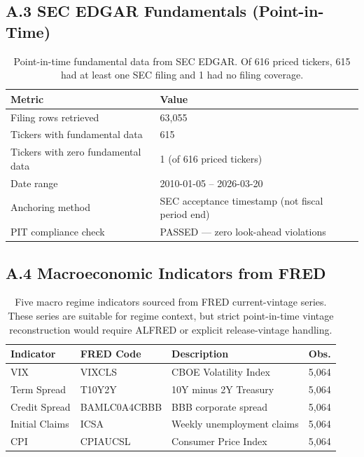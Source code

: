 \documentclass[11pt, a4paper]{article}
\begin{document}
\subsection*{A.3 SEC EDGAR Fundamentals (Point-in-Time)}
\begin{table}[h]
\centering
\begin{tabular}{ll}
\toprule
\textbf{Metric} & \textbf{Value} \\
\midrule
Filing rows retrieved & 63,055 \\
Tickers with fundamental data & 615 \\
Tickers with zero fundamental data & 1 (of 616 priced tickers) \\
Date range & 2010-01-05 -- 2026-03-20 \\
Anchoring method & SEC acceptance timestamp (not fiscal period end) \\
PIT compliance check & PASSED --- zero look-ahead violations \\
\bottomrule
\end{tabular}
\caption{Point-in-time fundamental data from SEC EDGAR. Of 616 priced tickers, 615 had at least one SEC filing and 1 had no filing coverage.}
\end{table}

\subsection*{A.4 Macroeconomic Indicators from FRED}
\begin{table}[h]
\centering
\begin{tabular}{llll}
\toprule
\textbf{Indicator} & \textbf{FRED Code} & \textbf{Description} & \textbf{Obs.} \\
\midrule
VIX & VIXCLS & CBOE Volatility Index & 5,064 \\
Term Spread & T10Y2Y & 10Y minus 2Y Treasury & 5,064 \\
Credit Spread & BAMLC0A4CBBB & BBB corporate spread & 5,064 \\
Initial Claims & ICSA & Weekly unemployment claims & 5,064 \\
CPI & CPIAUCSL & Consumer Price Index & 5,064 \\
\bottomrule
\end{tabular}
\caption{Five macro regime indicators sourced from FRED current-vintage series. These series are suitable for regime context, but strict point-in-time vintage reconstruction would require ALFRED or explicit release-vintage handling.}
\end{table}
\end{document}
